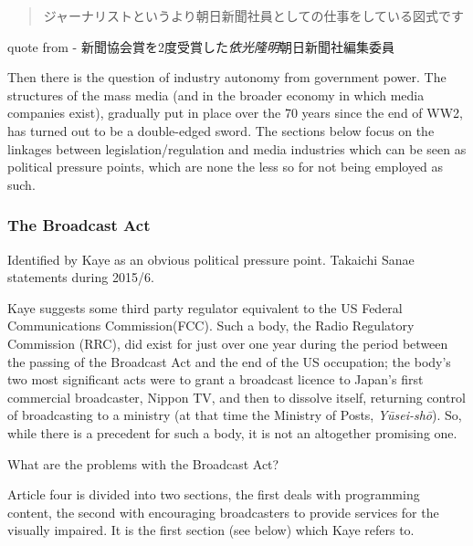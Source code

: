 \documentclass[11pt, headings=normal]{scrartcl}
\begin{document}
\begin{quote}
ジャーナリストというより朝日新聞社員としての仕事をしている図式です
\end{quote}

quote from - 新聞協会賞を2度受賞した\emph{依光隆明}朝日新聞社編集委員
\autocite{JCEJ:2014}

Then there is the question of industry autonomy from government power.
The structures of the mass media (and in the broader economy in which
media companies exist), gradually put in place over the 70 years since
the end of WW2, has turned out to be a double-edged sword. The sections
below focus on the linkages between legislation/regulation and media
industries which can be seen as political pressure points, which are
none the less so for not being employed as such.

\hypertarget{the-broadcast-act}{%
\subsubsection*{The Broadcast Act}\label{the-broadcast-act}}

Identified by Kaye as an obvious political pressure point. Takaichi
Sanae statements during 2015/6.

Kaye suggests some third party regulator equivalent to the US Federal
Communications Commission(FCC). Such a body, the Radio Regulatory
Commission (RRC), did exist for just over one year during the period
between the passing of the Broadcast Act and the end of the US
occupation; the body's two most significant acts were to grant a
broadcast licence to Japan's first commercial broadcaster, Nippon TV,
and then to dissolve itself, returning control of broadcasting to a
ministry (at that time the Ministry of Posts,
\emph{Yūsei-shō}).\autocite[41]{Ito:2010} So, while there is a precedent
for such a body, it is not an altogether promising one.

What are the problems with the Broadcast Act?

Article four is divided into two sections, the first deals with
programming content, the second with encouraging broadcasters to provide
services for the visually impaired. It is the first section (see below)
which Kaye refers to.
\end{document}
